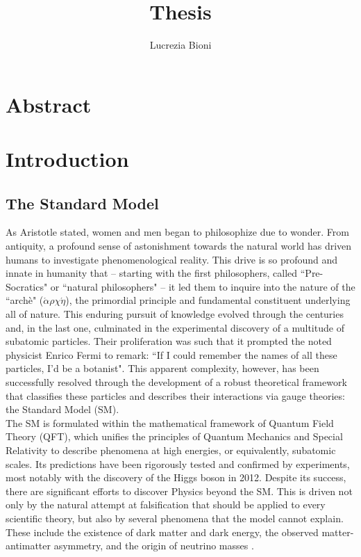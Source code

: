 \documentclass[a4paper, 12pt]{book}
\title{Thesis}
\author{Lucrezia Bioni}
\begin{document}
\frontmatter

\clearpage

\chapter*{Abstract}


\newpage

\pagestyle{contents}

\toc

\restoregeometry
\pagestyle{body}

\mainmatter


\chapter{Introduction}

\section{The Standard Model}


As Aristotle stated, women and men began to philosophize due to wonder. From antiquity, a profound sense of astonishment towards the natural world has driven humans to investigate phenomenological reality. This drive is so profound and innate in humanity that – starting with the first philosophers, called ``Pre-Socratics"  or ``natural philosophers" – it led them to inquire into the nature of the ``archè" ($\acute{\alpha}\rho\chi\acute{\eta}$), the primordial principle and fundamental constituent underlying all of nature. This enduring pursuit of knowledge evolved through the centuries and, in the last one, culminated in the experimental discovery of a multitude of subatomic particles. Their proliferation was such that it prompted the noted physicist Enrico Fermi to remark: ``If I could remember the names of all these particles, I'd be a botanist". This apparent complexity, however, has been successfully resolved through the development of a robust theoretical framework that classifies these particles and describes their interactions via gauge theories: the Standard Model (SM). \\
The SM is formulated within the mathematical framework of Quantum Field Theory (QFT), which unifies the principles of Quantum Mechanics and Special Relativity to describe phenomena at high energies, or equivalently, subatomic scales. Its predictions have been rigorously tested and confirmed by experiments, most notably with the discovery of the Higgs boson in 2012.  Despite its success, there are significant efforts to discover Physics beyond the SM. This is driven not only by the natural attempt at falsification that should be applied to every scientific theory, but also by several phenomena that the model cannot explain. These include the existence of dark matter and dark energy, the observed matter-antimatter asymmetry, and the origin of neutrino masses \cite{Campbell:2017}. \\
\end{document}
